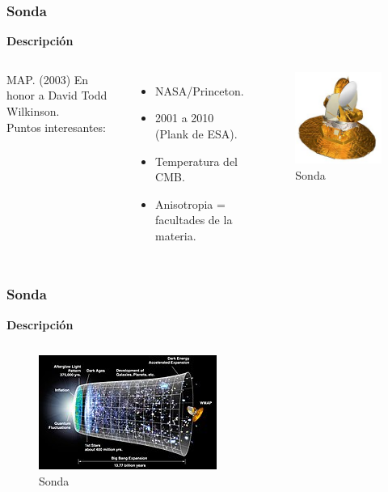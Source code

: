 \documentclass[UKenglish]{beamer}
\begin{document}
{\begin{frame}
\frametitle{Sonda}{\textbf{Descripción}}

\begin{columns}

MAP. (2003) En honor a David Todd Wilkinson. \\
Puntos interesantes:
\begin{itemize}
\item NASA/Princeton.
\item 2001 a 2010 (Plank de ESA).
\item Temperatura del CMB. 
\item Anisotropia = facultades de la materia.
\end{itemize}


  \begin{figure}[h!]
    \centering
    \includegraphics[scale=2]{sonda.jpg}
    \caption{Sonda}
    \label{fig:punto2s}
    \end{figure}
\end{columns}

\end{frame}
\begin{frame}
\frametitle{Sonda}{\textbf{Descripción}}

\begin{columns}

\begin{figure}[h!]
    \centering
    \includegraphics[scale=0.5]{sonda2.jpg}
    \caption{Sonda}
    \label{fig:puntos}
    \end{figure}


\end{columns}
\end{frame}}
\end{document}
